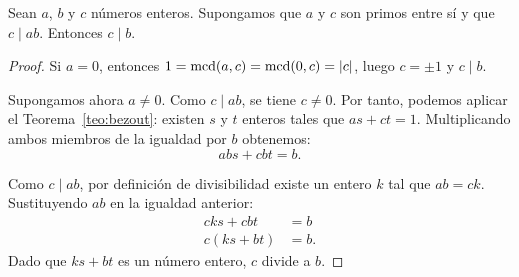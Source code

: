 \begin{lema}\label{lem:euclides}
    Sean $a$, $b$ y $c$ números enteros. Supongamos que $a$ y $c$ son primos entre
    sí y que $c \mid ab$. Entonces $c \mid b$.
\end{lema}

\begin{proof}
    Si $a = 0$, entonces $1 = \operatorname{mcd}(a, c) = \operatorname{mcd}(0, c) = |c|$,
    luego $c = \pm1$ y $c \mid b$.

    Supongamos ahora $a \ne 0$. Como $c \mid ab$, se tiene $c \ne 0$.
    Por tanto, podemos aplicar el Teorema~\ref{teo:bezout}: existen $s$ y $t$ enteros
    tales que $as + ct = 1$. Multiplicando ambos miembros de la igualdad por $b$ obtenemos:
    \[ abs + cbt = b. \]

    Como $c \mid ab$, por definición de divisibilidad existe un entero $k$ tal que
    $ab = ck$. Sustituyendo $ab$ en la igualdad anterior:
    \begin{align*}
        cks + cbt &= b \\
        c(ks + bt) &= b.
    \end{align*}
    Dado que $ks + bt$ es un número entero, $c$ divide a $b$.
\end{proof}
